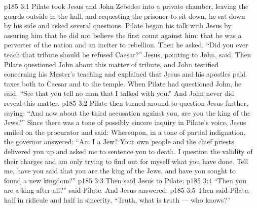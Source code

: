 \vs p185 3:1 Pilate took Jesus and John Zebedee into a private chamber, leaving the guards outside in the hall, and requesting the prisoner to sit down, he sat down by his side and asked several questions. Pilate began his talk with Jesus by assuring him that he did not believe the first count against him: that he was a perverter of the nation and an inciter to rebellion. Then he asked, “Did you ever teach that tribute should be refused Caesar?” Jesus, pointing to John, said,  Then Pilate questioned John about this matter of tribute, and John testified concerning his Master’s teaching and explained that Jesus and his apostles paid taxes both to Caesar and to the temple. When Pilate had questioned John, he said, “See that you tell no man that I talked with you.” And John never did reveal this matter.
\vs p185 3:2 Pilate then turned around to question Jesus further, saying: “And now about the third accusation against you, are you the king of the Jews?” Since there was a tone of possibly sincere inquiry in Pilate’s voice, Jesus smiled on the procurator and said:  Whereupon, in a tone of partial indignation, the governor answered: “Am I a Jew? Your own people and the chief priests delivered you up and asked me to sentence you to death. I question the validity of their charges and am only trying to find out for myself what you have done. Tell me, have you said that you are the king of the Jews, and have you sought to found a new kingdom?”
\vs p185 3:3 Then said Jesus to Pilate: 
\vs p185 3:4 “Then you are a king after all?” said Pilate. And Jesus answered: 
\vs p185 3:5 Then said Pilate, half in ridicule and half in sincerity, “Truth, what is truth --- who knows?”
